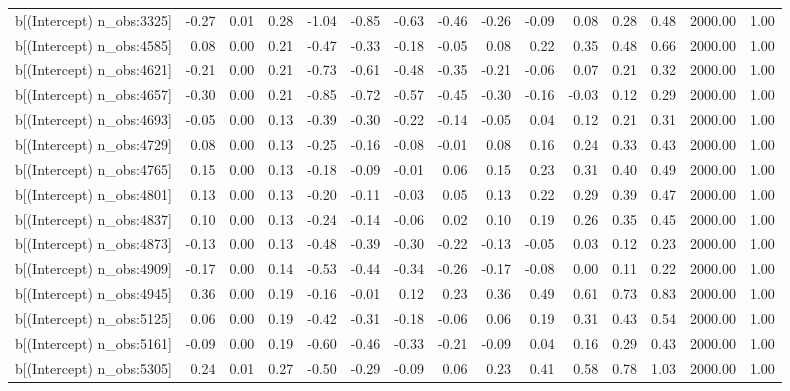 \begin{table}[ht]
\begin{tabular}{rrrrrrrrrrrrrrr}
  b[(Intercept) n\_obs:3325] & -0.27 & 0.01 & 0.28 & -1.04 & -0.85 & -0.63 & -0.46 & -0.26 & -0.09 & 0.08 & 0.28 & 0.48 & 2000.00 & 1.00 \\ 
  b[(Intercept) n\_obs:4585] & 0.08 & 0.00 & 0.21 & -0.47 & -0.33 & -0.18 & -0.05 & 0.08 & 0.22 & 0.35 & 0.48 & 0.66 & 2000.00 & 1.00 \\ 
  b[(Intercept) n\_obs:4621] & -0.21 & 0.00 & 0.21 & -0.73 & -0.61 & -0.48 & -0.35 & -0.21 & -0.06 & 0.07 & 0.21 & 0.32 & 2000.00 & 1.00 \\ 
  b[(Intercept) n\_obs:4657] & -0.30 & 0.00 & 0.21 & -0.85 & -0.72 & -0.57 & -0.45 & -0.30 & -0.16 & -0.03 & 0.12 & 0.29 & 2000.00 & 1.00 \\ 
  b[(Intercept) n\_obs:4693] & -0.05 & 0.00 & 0.13 & -0.39 & -0.30 & -0.22 & -0.14 & -0.05 & 0.04 & 0.12 & 0.21 & 0.31 & 2000.00 & 1.00 \\ 
  b[(Intercept) n\_obs:4729] & 0.08 & 0.00 & 0.13 & -0.25 & -0.16 & -0.08 & -0.01 & 0.08 & 0.16 & 0.24 & 0.33 & 0.43 & 2000.00 & 1.00 \\ 
  b[(Intercept) n\_obs:4765] & 0.15 & 0.00 & 0.13 & -0.18 & -0.09 & -0.01 & 0.06 & 0.15 & 0.23 & 0.31 & 0.40 & 0.49 & 2000.00 & 1.00 \\ 
  b[(Intercept) n\_obs:4801] & 0.13 & 0.00 & 0.13 & -0.20 & -0.11 & -0.03 & 0.05 & 0.13 & 0.22 & 0.29 & 0.39 & 0.47 & 2000.00 & 1.00 \\ 
  b[(Intercept) n\_obs:4837] & 0.10 & 0.00 & 0.13 & -0.24 & -0.14 & -0.06 & 0.02 & 0.10 & 0.19 & 0.26 & 0.35 & 0.45 & 2000.00 & 1.00 \\ 
  b[(Intercept) n\_obs:4873] & -0.13 & 0.00 & 0.13 & -0.48 & -0.39 & -0.30 & -0.22 & -0.13 & -0.05 & 0.03 & 0.12 & 0.23 & 2000.00 & 1.00 \\ 
  b[(Intercept) n\_obs:4909] & -0.17 & 0.00 & 0.14 & -0.53 & -0.44 & -0.34 & -0.26 & -0.17 & -0.08 & 0.00 & 0.11 & 0.22 & 2000.00 & 1.00 \\ 
  b[(Intercept) n\_obs:4945] & 0.36 & 0.00 & 0.19 & -0.16 & -0.01 & 0.12 & 0.23 & 0.36 & 0.49 & 0.61 & 0.73 & 0.83 & 2000.00 & 1.00 \\ 
  b[(Intercept) n\_obs:5125] & 0.06 & 0.00 & 0.19 & -0.42 & -0.31 & -0.18 & -0.06 & 0.06 & 0.19 & 0.31 & 0.43 & 0.54 & 2000.00 & 1.00 \\ 
  b[(Intercept) n\_obs:5161] & -0.09 & 0.00 & 0.19 & -0.60 & -0.46 & -0.33 & -0.21 & -0.09 & 0.04 & 0.16 & 0.29 & 0.43 & 2000.00 & 1.00 \\ 
  b[(Intercept) n\_obs:5305] & 0.24 & 0.01 & 0.27 & -0.50 & -0.29 & -0.09 & 0.06 & 0.23 & 0.41 & 0.58 & 0.78 & 1.03 & 2000.00 & 1.00 \\ 

\end{tabular}
\end{table}
